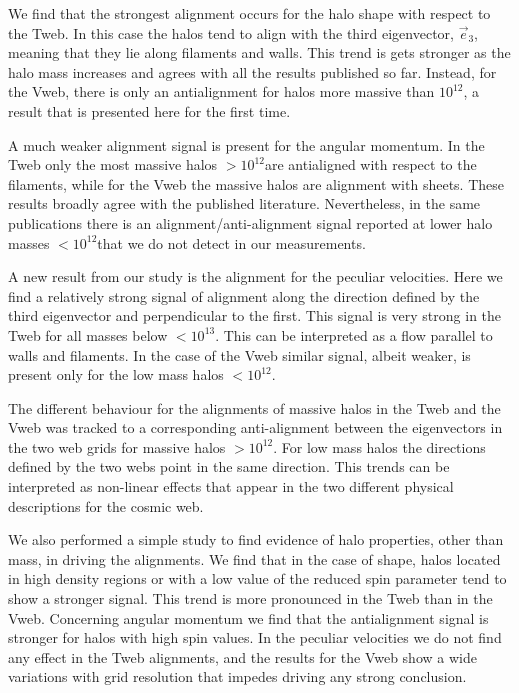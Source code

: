 \documentclass[useAMS,usenatbib]{mn2e}
\newcommand{\hMsun}{{\ifmmode{h^{-1}{\rm
        {M_{\odot}}}}\else{$h^{-1}{\rm{M_{\odot}}}$~}\fi}}
\begin{document}
We find that the strongest alignment occurs for the halo shape with
respect to the Tweb. In this case the halos tend to align with the
third eigenvector, $\vec{e}_3$, meaning that they lie along filaments
and walls. This trend is gets stronger as the halo mass
increases and agrees with all the results published so far. Instead,
for the Vweb, there is only an antialignment for halos more massive
than $10^{12}$\hMsun, a result that is presented here for the first
time.  

A much weaker alignment signal is present for the angular momentum. In
the Tweb only the most massive halos $>10^{12}$\hMsun are antialigned
with respect to the filaments, while for the Vweb the massive halos
are alignment with sheets. These results broadly agree with the
published literature. Nevertheless, in the same publications there is an
alignment/anti-alignment signal reported at lower halo masses
$<10^{12}$\hMsun that we do not detect in our measurements. 

A new result from our study is the alignment for the peculiar
velocities. Here we find a relatively strong signal of alignment along
the direction defined by the third eigenvector and perpendicular to
the first. This signal is very strong in the Tweb for all masses below
$<10^{13}$\hMsun. This can be interpreted as a flow parallel to walls
and filaments. In the case of the Vweb similar signal, albeit weaker,
is present only for the low mass halos $<10^{12}$\hMsun.

The different behaviour for the alignments of massive halos in the
Tweb and the Vweb was tracked to a corresponding anti-alignment
between the eigenvectors in the two web grids for massive halos
$>10^{12}$\hMsun. For low mass halos the directions defined by the two
webs point in the same direction. This trends can be interpreted as
non-linear effects that appear in the two different physical
descriptions for the cosmic web. 

We also performed a simple study to find evidence of halo properties,
other than mass, in driving the alignments. We find that in the case of
shape, halos located in high density regions or with a low value of
the reduced spin parameter tend to show a stronger signal. This trend is
more pronounced in the Tweb than in the Vweb. Concerning angular
momentum we find that the antialignment signal is stronger for halos
with high spin values. In the peculiar velocities we do not find any
effect in the Tweb alignments, and the results for the Vweb show a
wide variations with grid resolution that impedes driving any strong
conclusion. 
\end{document}
